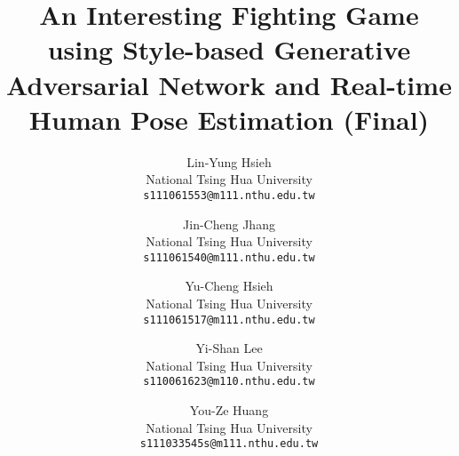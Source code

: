 \documentclass[10pt,twocolumn,letterpaper]{article}
\begin{document}
\title{An Interesting Fighting Game using Style-based Generative Adversarial Network and Real-time Human Pose Estimation (Final)}

\author{Lin-Yung Hsieh\\
National Tsing Hua University\\
{\tt\small s111061553@m111.nthu.edu.tw}
\and
Jin-Cheng Jhang\\
National Tsing Hua University\\
{\tt\small s111061540@m111.nthu.edu.tw}
\and
Yu-Cheng Hsieh\\
National Tsing Hua University\\
{\tt\small s111061517@m111.nthu.edu.tw}
\and
Yi-Shan Lee\\
National Tsing Hua University\\
{\tt\small s110061623@m110.nthu.edu.tw}
\and
You-Ze Huang\\
National Tsing Hua University\\
{\tt\small s111033545s@m111.nthu.edu.tw}
}

\maketitle











% 
% 
{\small


}
\end{document}
